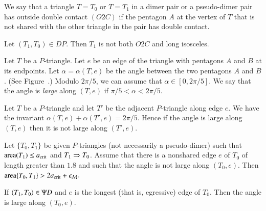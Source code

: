 \begin{definition}[O2C]
  We say that a triangle $T=T_0$ or $T=T_1$ in a dimer pair or a
  pseudo-dimer pair has outside double contact $(O2C)$ if the pentagon
  $A$ at the vertex of $T$ that is not shared with the other triangle in the
  pair has double contact.
\end{definition}

\begin{lemma}
  Let $(T_1,T_0)\in DP$.  Then $T_1$ is not both $O2C$ and long
  isosceles.
\end{lemma}

\begin{definition}  
  Let $T$ be a $P$-triangle.  Let $e$ be an edge of the triangle with
  pentagons $A$ and $B$ at its endpoints.  Let $\alpha = \alpha(T,e)$
  be the angle between the two pentagons $A$ and $B$.  (See
  Figure~.)  Modulo $2\pi/5$, we can assume that
  $\alpha\in [0,2\pi/5]$.  We say that the angle is {\it large} along
  $(T,e)$ if $\pi/5<\alpha < 2\pi/5$.  
\end{definition}


Let $T$ be a $P$-triangle and let $T'$ be the adjacent $P$-triangle
along edge $e$.  We have the invariant
$\alpha(T,e)+\alpha(T',e)=2\pi/5$.  Hence if the angle is large along
$(T,e)$ then it is not large along $(T',e)$.


\begin{lemma}
  Let $\{T_0,T_1\}$ be given $P$-triangles (not necessarily a
  pseudo-dimer) such that ${\operatorname{area}}(T_1)\le a_\text{crit}$ and $T_1\Rightarrow T_0$.
  Assume that there is a nonshared edge $e$ of $T_0$ of length greater
  than $1.8$ and such that the angle is not large along $(T_0,e)$.  Then
  ${\operatorname{area}}\{T_0,T_1\} > 2a_\text{crit} + \epsilon_{\mathcal M}$.
\end{lemma}

\begin{corollary}
  If $(T_1,T_0)\in \Psi D$ and $e$ is the longest (that is, egressive)
  edge of $T_0$.  Then the angle is large along $(T_0,e)$.
\end{corollary}

